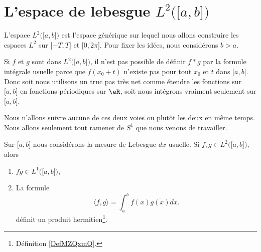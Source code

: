\section{L'espace de lebesgue \( L^2\big( \mathopen[ a , b \mathclose] \big)\)}

L'espace \( L^2\big( \mathopen[ a , b \mathclose] \big)\) est l'espace générique sur lequel nous allons construire les espaces \( L^2\) sur \( \mathopen[ -T , T \mathclose]\) et \( \mathopen[ 0 , 2\pi \mathclose]\). Pour fixer les idées, nous considérons \( b>a\).

Si \( f\) et \( g\) sont dans \( L^2\big( \mathopen[ a , b \mathclose] \big)\), il n'est pas possible de définir \( f*g\) par la formule intégrale usuelle parce que \( f(x_0+t)\) n'existe pas pour tout \( x_0\) et \( t\) dans \( \mathopen[ a , b \mathclose]\). Donc soit nous utilisons un truc pas très net comme étendre les fonctions sur \( \mathopen[ a , b \mathclose]\) en fonctions périodiques sur \( \eR\), soit nous intégrons vraiment seulement sur \( \mathopen[ a , b \mathclose]\).

Nous n'allons suivre aucune de ces deux voies ou plutôt les deux en même temps. Nous allons seulement tout ramener de \( S^1\) que nous venons de travailler.

\begin{propositionDef}
	Sur \( \mathopen[ a , b \mathclose]\) nous considérons la mesure de Lebesgue \( dx\) usuelle. Si \( f,g\in L^2\big( \mathopen[ a , b \mathclose] \big)\), alors
	\begin{enumerate}
		\item
		      \( f\bar g\in L^1\big( \mathopen[ a , b \mathclose] \big)\),
		\item
		      La formule
		      \begin{equation}    \label{EQooCRSXooPEopzm}
			      \langle f, g\rangle =\int_a^bf(x)\overline{ g(x) }dx.
		      \end{equation}
		      définit un produit hermitien\footnote{Définition \ref{DefMZQxmQ}.}.
	\end{enumerate}
\end{propositionDef}

